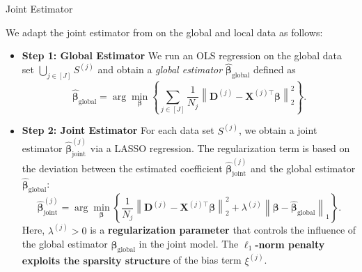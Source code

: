 \documentclass{beamer}
\newcommand{\mb}[1]{{\mathbf{#1}}}
\newcommand{\txrd}[1]{{\textcolor{sintefred}{\textbf{#1}}}}
\begin{document}
\begin{frame}{Joint Estimator}

We adapt the joint estimator from \citet{bastani2021predicting} on the global and local data as follows:

\begin{itemize}
    \item \txrd{Step 1: Global Estimator}
    We run an OLS regression on the global data set
    $\bigcup_{j \in [J]} S^{(j)}$
    and obtain a \textit{global estimator}
    $\hat{\bm\beta}_{\text{global}}$ defined as
    \begin{equation}
        \hat{\bm\beta}_{\text{global}}
        =
        \arg\min_{\bm\beta}
        \left\{
        \sum_{j \in [J]}
        \frac{1}{N_j}
        \left\|
            \mb D^{(j)} - \mb X^{(j)\top}\bm\beta
        \right\|_2^2
        \right\}.
        \label{eq:global_estimator}
    \end{equation}

    \item \txrd{Step 2: Joint Estimator}
    For each data set $S^{(j)}$, we obtain a joint estimator
    $\hat{\bm\beta}_{\text{joint}}^{(j)}$
    via a LASSO regression.
    The regularization term is based on the deviation between
    the estimated coefficient
    $\hat{\bm\beta}_{\text{joint}}^{(j)}$
    and the global estimator
    $\hat{\bm\beta}_{\text{global}}$:
    \begin{equation}
        \hat{\bm\beta}_{\text{joint}}^{(j)}
        =
        \arg\min_{\bm\beta}
        \left\{
        \frac{1}{N_j}
        \left\|
            \mb D^{(j)} - \mb X^{(j)\top}\bm\beta
        \right\|_2^2
        +
        \lambda^{(j)}
        \left\|
            \bm\beta - \hat{\bm\beta}_{\text{global}}
        \right\|_1
        \right\}.
        \label{eq:joint_estimator}
    \end{equation}
    Here, $\lambda^{(j)} > 0$ is a \txrd{regularization parameter} that controls
    the influence of the global estimator
    $\hat{\bm\beta}_{\text{global}}$
    in the joint model.
    The \txrd{$\ell_1$-norm penalty exploits the sparsity structure} of the bias term
    $\xi^{(j)}$.
\end{itemize}

\end{frame}



\end{document}

